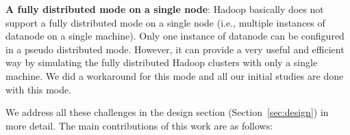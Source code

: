 



\textbf{A fully distributed mode on a single node}: Hadoop basically does not support a fully distributed mode on a single node (i.e., multiple instances of datanode on a single machine). Only one instance of datanode can be configured in a pseudo distributed mode. However, it can provide a very useful and efficient way by simulating the fully distributed Hadoop clusters with only a single machine. We did a workaround for this mode and all our initial studies are done with this mode. 



We address all these challenges in the design section (Section~\ref{sec:design}) in more detail. The main contributions of this work are as follows:

